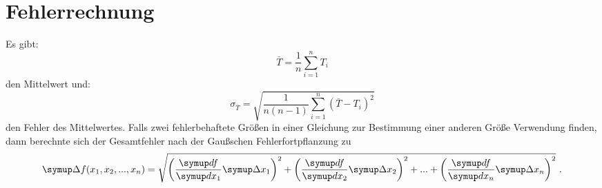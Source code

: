 \section{Fehlerrechnung}
Es gibt:
\begin{equation}
  \bar{T} = \frac{1}{n} \sum_{i=1}^{n} T_{i}
  \label{eqn:1}
\end{equation}
den Mittelwert und:
\begin{equation}
  \sigma_{\bar{T}} = \sqrt{\frac{1}{n(n-1)} \sum_{i=1}^{n}(\bar{T}-T_i)^2}
  \label{eqn:2}
\end{equation}
den Fehler des Mittelwertes. Falls zwei fehlerbehaftete Größen in einer Gleichung
zur Bestimmung einer anderen Größe Verwendung finden, dann berechnte sich der Gesamtfehler
nach der Gaußschen Fehlerfortpflanzung zu
\begin{equation}
    \symup \Delta f(x_1, x_2, ..., x_n) = \sqrt{\left(\frac{\symup df}{\symup dx_1} \symup \Delta
    x_1 \right)^2 +    \left(\frac{\symup df}{\symup dx_2} \symup \Delta
    x_2 \right)^2 + ... + \left(\frac{\symup df}{\symup dx_n} \symup \Delta x_n \right)^2} \ .
\end{equation}

